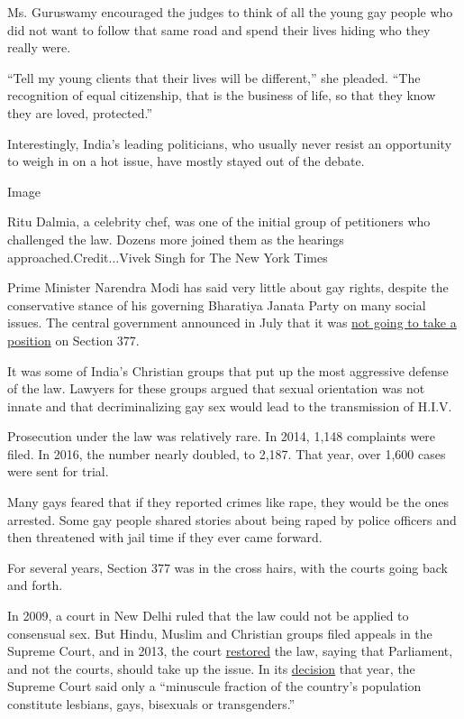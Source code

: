 Ms. Guruswamy encouraged the judges to think of all the young gay people
who did not want to follow that same road and spend their lives hiding
who they really were.

``Tell my young clients that their lives will be different,'' she
pleaded. ``The recognition of equal citizenship, that is the business of
life, so that they know they are loved, protected.''

Interestingly, India's leading politicians, who usually never resist an
opportunity to weigh in on a hot issue, have mostly stayed out of the
debate.

Image

Ritu Dalmia, a celebrity chef, was one of the initial group of
petitioners who challenged the law. Dozens more joined them as the
hearings approached.Credit...Vivek Singh for The New York Times

Prime Minister Narendra Modi has said very little about gay rights,
despite the conservative stance of his governing Bharatiya Janata Party
on many social issues. The central government announced in July that it
was
\href{https://timesofindia.indiatimes.com/india/decriminalising-gay-sex-centre-says-it-will-leave-decision-to-wisdom-of-court/articleshow/64942900.cms}{not
going to take a position} on Section 377.

It was some of India's Christian groups that put up the most aggressive
defense of the law. Lawyers for these groups argued that sexual
orientation was not innate and that decriminalizing gay sex would lead
to the transmission of H.I.V.

Prosecution under the law was relatively rare. In 2014, 1,148 complaints
were filed. In 2016, the number nearly doubled, to 2,187. That year,
over 1,600 cases were sent for trial.

Many gays feared that if they reported crimes like rape, they would be
the ones arrested. Some gay people shared stories about being raped by
police officers and then threatened with jail time if they ever came
forward.

For several years, Section 377 was in the cross hairs, with the courts
going back and forth.

In 2009, a court in New Delhi ruled that the law could not be applied to
consensual sex. But Hindu, Muslim and Christian groups filed appeals in
the Supreme Court, and in 2013, the court
\href{https://www.nytimes.com/2013/12/12/world/asia/court-restores-indias-ban-on-gay-sex.html}{restored}
the law, saying that Parliament, and not the courts, should take up the
issue. In its
\href{https://www.scribd.com/doc/190888550/Naz-Section377-Supreme-Court}{decision}
that year, the Supreme Court said only a ``minuscule fraction of the
country's population constitute lesbians, gays, bisexuals or
transgenders.''

